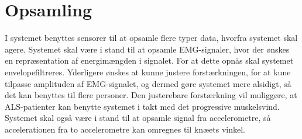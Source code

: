 \section{Opsamling} \label{sec:sensorer}
I systemet benyttes sensorer til at opsamle flere typer data, hvorfra systemet skal agere. Systemet skal være i stand til at opsamle EMG-signaler, hvor der ønskes en repræsentation af energimængden i signalet. For at dette opnås skal systemet envelopefiltreres. Yderligere ønskes at kunne justere forstærkningen, for at kune tilpasse amplituden af EMG-signalet, og dermed gøre systemet mere alsidigt, så det kan benyttes til flere personer. Den justerebare forstærkning vil muliggøre, at ALS-patienter kan benytte systemet i takt med det progressive muskelsvind.
Systemet skal også være i stand til at opsamle signal fra accelerometre, så accelerationen fra to accelerometre kan omregnes til knæets vinkel.
